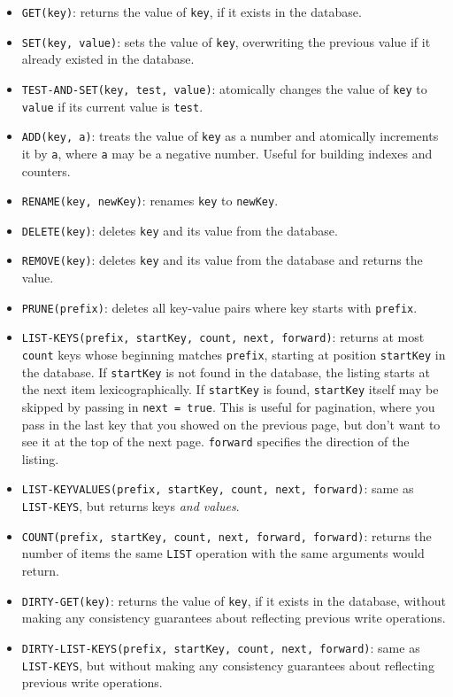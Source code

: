 \documentclass[12pt]{article}
\begin{document}
\begin{itemize}
\sloppy
\item \texttt{GET(key)}: returns the value of \texttt{key}, if it exists in the database.
\item \texttt{SET(key, value)}: sets the value of \texttt{key}, overwriting the previous value if it already existed in the database.
\item \texttt{TEST-AND-SET(key, test, value)}: atomically changes the value of \texttt{key} to \texttt{value} if its current value is \texttt{test}.
\item \texttt{ADD(key, a)}: treats the value of \texttt{key} as a number and atomically increments it by \texttt{a}, where \texttt{a} may be a negative number. Useful for building indexes and counters.
\item \texttt{RENAME(key, newKey)}: renames \texttt{key} to \texttt{newKey}.
\item \texttt{DELETE(key)}: deletes \texttt{key} and its value from the database.
\item \texttt{REMOVE(key)}: deletes \texttt{key} and its value from the database and returns the value.
\item \texttt{PRUNE(prefix)}: deletes all key-value pairs where key starts with \texttt{prefix}.
\item \texttt{LIST-KEYS(prefix, startKey, count, next, forward)}: returns at most \texttt{count} keys whose beginning matches \texttt{prefix}, starting at position \texttt{startKey} in the database. If \texttt{startKey} is not found in the database, the listing starts at the next item lexicographically. If \texttt{startKey} is found, \texttt{startKey} itself may be skipped by passing in \texttt{next = true}. This is useful for pagination, where you pass in the last key that you showed on the previous page, but don't want to see it at the top of the next page. \texttt{forward} specifies the direction of the listing.
\item \texttt{LIST-KEYVALUES(prefix, startKey, count, next, forward)}: same as \texttt{LIST-KEYS}, but returns keys \textit{and values}.
\item \texttt{COUNT(prefix, startKey, count, next, forward, forward)}: returns the number of items the same \texttt{LIST} operation with the same arguments would return.
\item \texttt{DIRTY-GET(key)}: returns the value of \texttt{key}, if it exists in the database, without making any consistency guarantees about reflecting previous write operations.
\item \texttt{DIRTY-LIST-KEYS(prefix, startKey, count, next, forward)}: same as \texttt{LIST-KEYS}, but without making any consistency guarantees about reflecting previous write operations.

\end{itemize}
\end{document}
